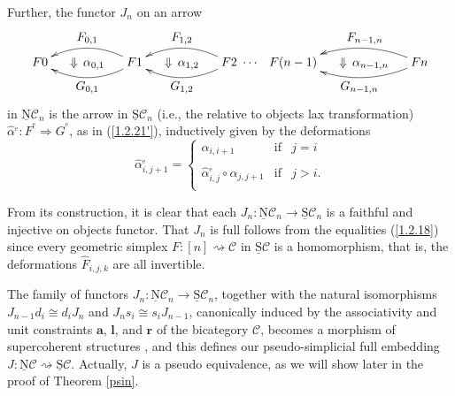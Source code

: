 \documentclass[]{amsart}
\begin{document}
Further, the functor $J_n$ on an arrow
$$
\xymatrix @C=1pc {F0  & {\Downarrow\, \alpha_{0,1}} & F1 \ar@/^1pc/[ll]^{\textstyle G_{0,1}}
\ar@/_1pc/[ll]_-{\textstyle F_{0,1}} & {\Downarrow\, \alpha_{1,2}} & F2  \ar@/^1pc/[ll]^{\textstyle
G_{1,2}} \ar@/_1pc/[ll]_-{\textstyle F_{1,2}}&\hspace{-15pt}\cdots&\hspace{-10pt}
 F(n-1)
  & {\Downarrow\, \alpha_{n-1,n}} & Fn
\ar@/^1pc/[ll]^{\textstyle G_{n-1,n}} \ar@/_1pc/[ll]_-{\textstyle F_{n-1,n}}}
$$
in ${\ensuremath{\underline{\mathrm{N}}}}{\ensuremath{\mathcal{C}}}_n$ is the arrow in $\underline{\mathrm{S}}{\ensuremath{\mathcal{C}}}_n$ (i.e., the relative to objects lax
transformation) ${\widehat{\alpha}^{_{\mathrm e}}:F^{^{\mathrm e}}\Rightarrow G^{^{\mathrm e}}}$,
as in (\ref{1.2.21'}),  inductively given by the deformations
$$\widehat{\alpha}^{_{\mathrm e}}_{i,j+1}=\left\{\begin{array}{lll}
    \alpha_{i,i+1} & \text{if} & j=i \\
    &&\\
\widehat{\alpha}^{_{\mathrm e}}_{i,j}\circ \alpha_{j,j+1} & \text{if} & j>i. \\
\end{array}\right.$$

From its construction, it is clear that each $J_n:{\ensuremath{\underline{\mathrm{N}}}}{\ensuremath{\mathcal{C}}}_n \rightarrow \underline{\mathrm{S}}{\ensuremath{\mathcal{C}}}_n$
is a faithful and injective on objects functor. That $J_n$ is full follows from the equalities
(\ref{1.2.18}) since every geometric simplex $F:[n]\rightsquigarrow {\ensuremath{\mathcal{C}}}$ in
$\underline{\mathrm{S}}{\ensuremath{\mathcal{C}}}$ is a homomorphism, that is, the  deformations $\widehat{F}_{i,j,k}$ are
all invertible.

The family of functors $J_n:{\ensuremath{\underline{\mathrm{N}}}}{\ensuremath{\mathcal{C}}}_n\to \underline{\mathrm{S}}{\ensuremath{\mathcal{C}}}_n$, together with the natural
isomorphisms $J_{n-1}d_i\cong d_iJ_n$ and $J_ns_i\cong s_i J_{n-1}$, canonically induced by the
associativity and unit constraints $\boldsymbol{a}$, $\boldsymbol{l}$, and $\boldsymbol{r}$ of the
bicategory ${\ensuremath{\mathcal{C}}}$, becomes a morphism of supercoherent structures \cite{jardine}, and this defines
our pseudo-simplicial full embedding $J:{\ensuremath{\underline{\mathrm{N}}}}{\ensuremath{\mathcal{C}}}\rightsquigarrow \underline{\mathrm{S}}{\ensuremath{\mathcal{C}}}$.
Actually, $J$ is a pseudo equivalence, as we will show later in the proof of Theorem \ref{psin}.
\end{document}
